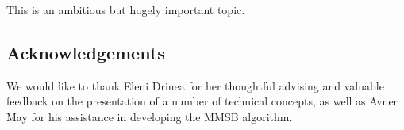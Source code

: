 \bigskip

This is an ambitious but hugely important topic.

\subsection{Acknowledgements}

We would like to thank Eleni Drinea for her thoughtful advising and valuable feedback on the presentation of a number of technical concepts, as well as Avner May for his assistance in developing the MMSB algorithm.